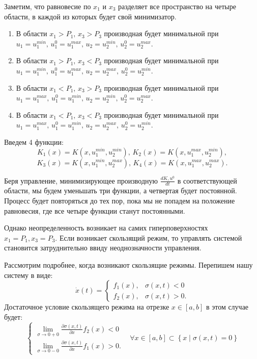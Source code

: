 \documentclass[11pt]{article}
\newcommand\Set[2]{\left\{ #1 \mid #2 \right\}}
\newcommand\dd[2]{\frac{\partial#1}{\partial#2}}
\begin{document}
Заметим, что равновесие по $x_1$ и $x_3$ разделяет все пространство на четыре области, в каждой из которых будет свой минимизатор.
\begin{enumerate}
\item
	В области $x_1 > P_1, \, x_3 > P_3$ производная будет минимальной при $u_1 = u_1^{min}, \, u_1^0 = u_1^{max}, \, u_2 = u_2^{min}, \, u_2^0 = u_2^{max}.$
\item
	В области $x_1 > P_1, \, x_3 < P_3$ производная будет минимальной при $u_1 = u_1^{min}, \, u_1^0 = u_1^{max}, \, u_2 = u_2^{max}, \, u_2^0 = u_2^{min}.$
\item
	В области $x_1 < P_1, \, x_3 > P_3$ производная будет минимальной при $u_1 = u_1^{max}, \, u_1^0 = u_1^{min}, \, u_2 = u_2^{min}, \, u_2^0 = u_2^{max}.$
\item
	В области $x_1 < P_1, \, x_3 < P_3$ производная будет минимальной при $u_1 = u_1^{max}, \, u_1^0 = u_1^{min}, \, u_2 = u_2^{max}, \, u_2^0 = u_2^{min}.$
\end{enumerate}

Введем 4 функции:
$$K_1(x) = K(x,u_1^{min}, u_2^{min}), \, K_2(x) = K(x,u_1^{max}, u_2^{min}),$$ 
$$K_3(x) = K(x,u_1^{min}, u_2^{max}), \, K_4(x) = K(x,u_1^{max}, u_2^{max}).$$

Беря управление, минимизирующее производную $\frac{dK, u^0}{dt}$ в соответствующей области, мы будем уменьшать три функции, а четвертая будет постоянной. Процесс будет повторяться до тех пор, пока мы не попадем на положение равновесия, где все четыре функции станут постоянными. 


Однако неопределенность возникает на самих гиперповерхностях $x_1 = P_1, x_3 = P_3.$ Если возникает скользящий режим, то управлять системой становится затруднительно ввиду неоднозначности управления. 

Рассмотрим подробнее, когда возникают скользящие режимы. Перепишем нашу систему в виде:
$$\dot x(t) = \begin{cases} f_1(x), & \sigma(x,t) < 0 \\ f_2(x), & \sigma(x,t) > 0.\end{cases}$$
Достаточное условие скользящего режима на отрезке $x \in [a, b]$ в этом случае будет:
$$
\left\{
\begin{aligned}
    \lim_{\sigma \to 0+0}\dd{\sigma(x,t)}{x} f_2(x) < 0 \\
    \lim_{\sigma \to 0-0} \dd{\sigma(x,t)}{x} f_1(x) > 0.
\end{aligned}
\right.
\;\;\; \forall x \in [a, b] \subset \Set{x}{\sigma(x,t) = 0}
$$
\end{document}
